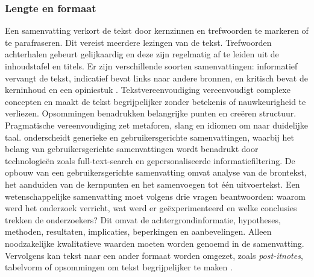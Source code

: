 \subsubsection{Lengte en formaat}

Een samenvatting verkort de tekst door kernzinnen en trefwoorden te markeren of te parafraseren. Dit vereist meerdere lezingen van de tekst. Trefwoorden achterhalen gebeurt gelijkaardig en deze zijn regelmatig af te leiden uit de inhoudstafel en titels. Er zijn verschillende soorten samenvattingen: informatief vervangt de tekst, indicatief bevat links naar andere bronnen, en kritisch bevat de kerninhoud en een opiniestuk \autocite{Rijkhoff2022, Hahn2000}. Tekstvereenvoudiging vereenvoudigt complexe concepten en maakt de tekst begrijpelijker zonder betekenis of nauwkeurigheid te verliezen. Opsommingen benadrukken belangrijke punten en creëren structuur. Pragmatische vereenvoudiging zet metaforen, slang en idiomen om naar duidelijke taal. \textcite{Hahn2000} onderscheidt generieke en gebruikersgerichte samenvattingen, waarbij het belang van gebruikersgerichte samenvattingen wordt benadrukt door technologieën zoals full-text-search en gepersonaliseerde informatiefiltering. De opbouw van een gebruikersgerichte samenvatting omvat analyse van de brontekst, het aanduiden van de kernpunten en het samenvoegen tot één uitvoertekst. Een wetenschappelijke samenvatting moet volgens \textcite{Hollenkamp2020, McCombes2022} drie vragen beantwoorden: waarom werd het onderzoek verricht, wat werd er geëxperimenteerd en welke conclusies trekken de onderzoekers? Dit omvat de achtergrondinformatie, hypotheses, methoden, resultaten, implicaties, beperkingen en aanbevelingen. Alleen noodzakelijke kwalitatieve waarden moeten worden genoemd in de samenvatting. Vervolgens kan tekst naar een ander formaat worden omgezet, zoals \textit{post-itnotes}, tabelvorm of opsommingen om tekst begrijpelijker te maken \autocite{Rijkhoff2022}. 


